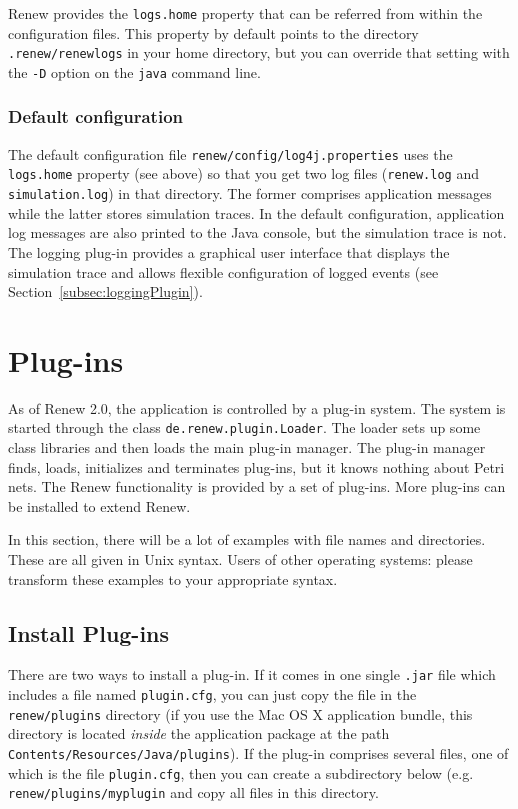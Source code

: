 Renew provides the \texttt{logs.home} property that can be referred from
within the configuration files.
This property by default points to the directory \texttt{.renew/renewlogs} in your
home directory, but you can override that setting with the \texttt{-D}
option on the \texttt{java} command line.



\subsubsection{Default configuration}
The default configuration file
\texttt{renew\renewversion/config/log4j.properties} uses the
\texttt{logs.home} property (see above) so that you get two log files
(\texttt{renew.log} and \texttt{simulation.log}) in that directory.
The former comprises application messages while the latter stores
simulation traces.
In the default configuration, application log messages are also printed to
the Java console, but the simulation trace is not.
The logging plug-in provides a graphical user interface that displays the
simulation trace and allows flexible configuration of logged events (see
Section~\ref{subsec:loggingPlugin}).


\section{Plug-ins}
\label{sec:plugins}
As of Renew 2.0, the application is controlled by
a plug-in system.
The system is started through the class
\texttt{de.renew.plugin.Loader}.
The loader sets up some class libraries and then loads the main plug-in
manager.
The plug-in manager finds, loads, initializes and terminates
plug-ins, but it knows nothing about Petri nets.
The Renew functionality is provided by a set of plug-ins.
More plug-ins can be installed to extend Renew.

In this section, there will be a lot of examples with file names and
directories.
These are all given in Unix syntax.
Users of other operating systems: please transform these
examples to your appropriate syntax.

\subsection{Install Plug-ins}
\label{subsec:installPlugins}
There are two ways to install a plug-in.
If it comes in one single \texttt{.jar} file which includes a file
named \texttt{plugin.cfg}, you can just copy the file in the
\texttt{renew\renewversion/plugins} directory
(if you use the Mac OS X application bundle, this directory is located
\emph{inside} the application package at the path
\texttt{Contents/Resources/Java/plugins}).
If the plug-in comprises several files, one of which is the file
\texttt{plugin.cfg}, then you can create a subdirectory below
(e.g. \texttt{renew\renewversion/plugins/myplugin} and copy all
files in this directory.

